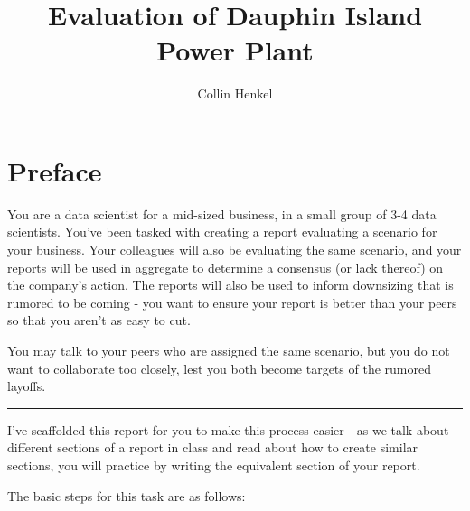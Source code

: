 \documentclass[
  letterpaper,
  DIV=11,
  numbers=noendperiod]{scrreprt}
\title{Evaluation of Dauphin Island Power Plant}
\author{Collin Henkel}
\date{}
\renewcommand*\contentsname{Table of contents}
\newcommand\contentsname{Table of contents}
\begin{document}
\maketitle

\renewcommand*\contentsname{Table of contents}
{
\hypersetup{linkcolor=}
\setcounter{tocdepth}{2}
\tableofcontents
}


\chapter*{Preface}\label{preface}


You are a data scientist for a mid-sized business, in a small group of
3-4 data scientists. You've been tasked with creating a report
evaluating a scenario for your business. Your colleagues will also be
evaluating the same scenario, and your reports will be used in aggregate
to determine a consensus (or lack thereof) on the company's action. The
reports will also be used to inform downsizing that is rumored to be
coming - you want to ensure your report is better than your peers so
that you aren't as easy to cut.

You may talk to your peers who are assigned the same scenario, but you
do not want to collaborate too closely, lest you both become targets of
the rumored layoffs.

\begin{center}\rule{0.5\linewidth}{0.5pt}\end{center}

I've scaffolded this report for you to make this process easier - as we
talk about different sections of a report in class and read about how to
create similar sections, you will practice by writing the equivalent
section of your report.

The basic steps for this task are as follows:
\end{document}
